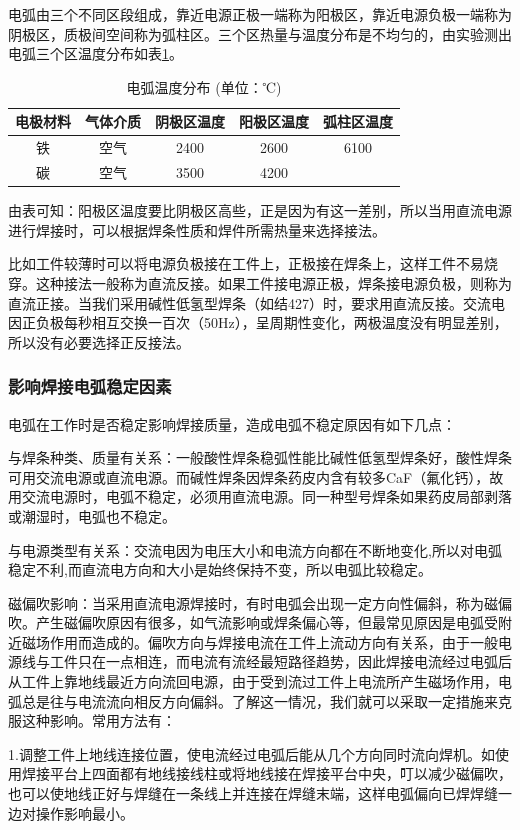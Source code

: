 \documentclass{ctexbook}
\begin{document}
电弧由三个不同区段组成，靠近电源正极一端称为阳极区，靠近电源负极一端称为阴极区，质极间空间称为弧柱区。三个区热量与温度分布是不均匀的，由实验测出电弧三个区温度分布如表\ref{tab:dianhuwendu}。
\begin{table}[htbp]
	\centering
	\caption{电弧温度分布 (单位：℃)}
	\begin{tabular}{c|c|c|c|c}
		\hline
		电极材料  & 气体介质  & 阴极区温度 & 阳极区温度 & 弧柱区温度 \\ \hline
		铁     & 空气    & 2400  & 2600  & 6100 \\ \hline
		碳     & 空气    & 3500  & 4200  &  \\ \hline
	\end{tabular}%
	\label{tab:dianhuwendu}%
\end{table}%
由表可知：阳极区温度要比阴极区高些，正是因为有这一差别，所以当用直流电源进行焊接时，可以根据焊条性质和焊件所需热量来选择接法。

比如工件较薄时可以将电源负极接在工件上，正极接在焊条上，这样工件不易烧穿。这种接法一般称为直流反接。如果工件接电源正极，焊条接电源负极，则称为直流正接。当我们采用碱性低氢型焊条（如结427）时，要求用直流反接。交流电因正负极每秒相互交换一百次（50Hz），呈周期性变化，两极温度没有明显差别，所以没有必要选择正反接法。
\subsubsection{影响焊接电弧稳定因素}
电弧在工作时是否稳定影响焊接质量，造成电弧不稳定原因有如下几点：

与焊条种类、质量有关系：一般酸性焊条稳弧性能比碱性低氢型焊条好，酸性焊条可用交流电源或直流电源。而碱性焊条因焊条药皮内含有较多CaF（氟化钙），故用交流电源时，电弧不稳定，必须用直流电源。同一种型号焊条如果药皮局部剥落或潮湿时，电弧也不稳定。

与电源类型有关系：交流电因为电压大小和电流方向都在不断地变化,所以对电弧稳定不利,而直流电方向和大小是始终保持不变，所以电弧比较稳定。

磁偏吹影响：当采用直流电源焊接时，有时电弧会出现一定方向性偏斜，称为磁偏吹。产生磁偏吹原因有很多，如气流影响或焊条偏心等，但最常见原因是电弧受附近磁场作用而造成的。偏吹方向与焊接电流在工件上流动方向有关系，由于一般电源线与工件只在一点相连，而电流有流经最短路径趋势，因此焊接电流经过电弧后从工件上靠地线最近方向流回电源，由于受到流过工件上电流所产生磁场作用，电弧总是往与电流流向相反方向偏斜。了解这一情况，我们就可以采取一定措施来克服这种影响。常用方法有：

1.调整工件上地线连接位置，使电流经过电弧后能从几个方向同时流向焊机。如使用焊接平台上四面都有地线接线柱或将地线接在焊接平台中央，叮以减少磁偏吹，也可以使地线正好与焊缝在一条线上并连接在焊缝末端，这样电弧偏向已焊焊缝一边对操作影响最小。
\end{document}
